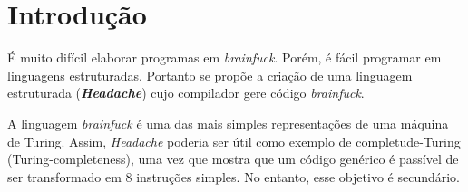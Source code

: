 %
%
% 
%

\chapter{Introdução}
\noindent

É muito difícil elaborar programas em \textit{brainfuck}. Porém, é fácil programar em linguagens estruturadas. Portanto se propõe a criação de uma linguagem estruturada (\textbf{\textit{Headache}}) cujo compilador gere código \textit{brainfuck}.				

A linguagem \textit{brainfuck} é uma das mais simples representações de uma máquina de Turing. Assim, \textit{Headache} poderia ser útil como exemplo de completude-Turing (Turing-completeness), uma vez que mostra que um código genérico é passível de ser transformado em 8 instruções simples. No entanto, esse objetivo é secundário.

